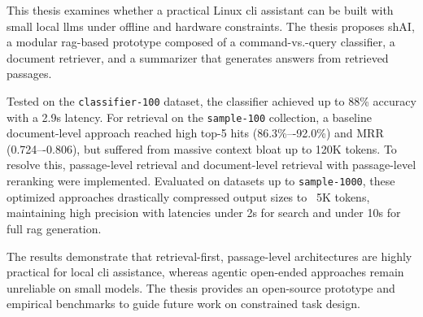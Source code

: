 This thesis examines whether a practical Linux \gls{cli} assistant can be built
with small local \glspl{llm} under offline and hardware constraints.
The thesis proposes shAI, a modular \gls{rag}-based prototype composed of a
command-vs.-query classifier, a document retriever,
and a summarizer that generates answers from retrieved passages.

Tested on the \texttt{classifier-100} dataset, the classifier achieved up to
88\% accuracy with a 2.9s latency. For retrieval on the \texttt{sample-100}
collection, a baseline document-level approach reached high top-5 hits
(86.3\%–-92.0\%) and MRR (0.724–-0.806), but suffered from massive context bloat
up to 120K tokens. To resolve this, passage-level retrieval and document-level
retrieval with passage-level reranking were implemented. Evaluated on datasets
up to \texttt{sample-1000}, these optimized approaches drastically compressed
output sizes to ~5K tokens, maintaining high precision with latencies under 2s
for search and under 10s for full \gls{rag} generation.

The results demonstrate that retrieval-first, passage-level architectures are
highly practical for local \gls{cli} assistance, whereas agentic open-ended
approaches remain unreliable on small models. The thesis provides an open-source
prototype and empirical benchmarks to guide future work on constrained task
design.
